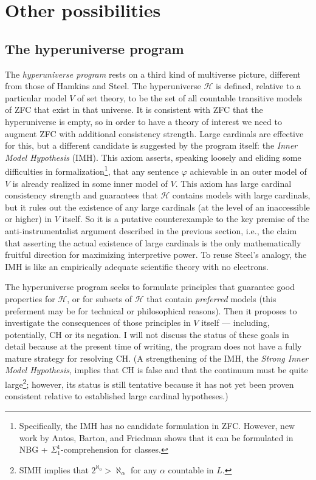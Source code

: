 \documentclass[letterpaper,12pt]{article}
\renewcommand{\phi}{\varphi}
\begin{document}
\section{Other possibilities}
\subsection{The hyperuniverse program}
\label{hyperuniverse}
The \emph{hyperuniverse program} \citep{arrigoni2013hyperuniverse} rests on a third kind of multiverse picture, different from those of Hamkins and Steel. The hyperuniverse $\mathcal{H}$ is defined, relative to a particular model $V$ of set theory, to be the set of all countable transitive models of ZFC that exist in that universe. It is consistent with ZFC that the hyperuniverse is empty, so in order to have a theory of interest we need to augment ZFC with additional consistency strength. Large cardinals are effective for this, but a different candidate is suggested by the program itself: the \emph{Inner Model Hypothesis} (IMH). This axiom asserts, speaking loosely and eliding some difficulties in formalization\footnote{Specifically, the IMH has no candidate formulation in ZFC. However, new work by Antos, Barton, and Friedman shows that it can be formulated in NBG + $\Sigma^1_1$-comprehension for classes.}, that any sentence $\phi$ achievable in an outer model of $V$ is already realized in some inner model of $V$. This axiom has large cardinal consistency strength and guarantees that $\mathcal{H}$ contains models with large cardinals, but it rules out the existence of any large cardinals (at the level of an inaccessible or higher) in $V$ itself. So it is a putative counterexample to the key premise of the anti-instrumentalist argument described in the previous section, i.e., the claim that asserting the actual existence of large cardinals is the only mathematically fruitful direction for maximizing interpretive power. To reuse Steel's analogy, the IMH is like an empirically adequate scientific theory with no electrons.

The hyperuniverse program seeks to formulate principles that guarantee good properties for $\mathcal{H}$, or for subsets of $\mathcal{H}$ that contain \emph{preferred} models (this preferment may be for technical or philosophical reasons). Then it proposes to investigate the consequences of those principles in $V$ itself --- including, potentially, CH or its negation. I will not discuss the status of these goals in detail because at the present time of writing, the program does not have a fully mature strategy for resolving CH. (A strengthening of the IMH, the \emph{Strong Inner Model Hypothesis}, implies that CH is false and that the continuum must be quite large\footnote{SIMH implies that $2^{\aleph_0} > \aleph_\alpha$ for any $\alpha$ countable in $L$.}; however, its status is still tentative because it has not yet been proven consistent relative to established large cardinal hypotheses.)
\end{document}
